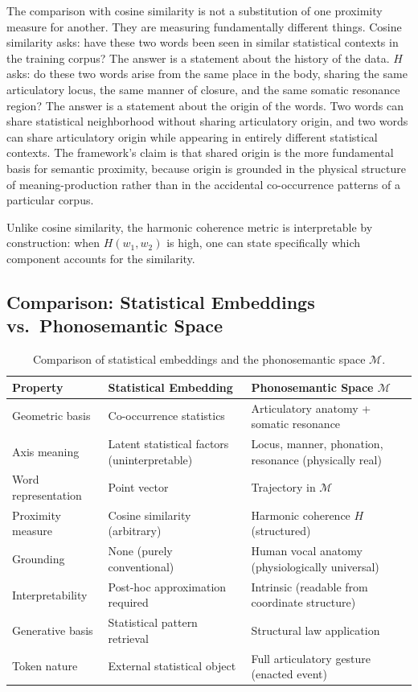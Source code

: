 \documentclass[12pt]{article}
\begin{document}
The comparison with cosine similarity is not a substitution of one proximity measure for another. They are measuring fundamentally different things. Cosine similarity asks: have these two words been seen in similar statistical contexts in the training corpus? The answer is a statement about the history of the data. $H$ asks: do these two words arise from the same place in the body, sharing the same articulatory locus, the same manner of closure, and the same somatic resonance region? The answer is a statement about the origin of the words. Two words can share statistical neighborhood without sharing articulatory origin, and two words can share articulatory origin while appearing in entirely different statistical contexts. The framework's claim is that shared origin is the more fundamental basis for semantic proximity, because origin is grounded in the physical structure of meaning-production rather than in the accidental co-occurrence patterns of a particular corpus.

Unlike cosine similarity, the harmonic coherence metric is interpretable by construction: when $H(w_1, w_2)$ is high, one can state specifically which component accounts for the similarity.

\subsection{Comparison: Statistical Embeddings vs.\ Phonosemantic Space}

\begin{table}[htbp]
\centering
\renewcommand{\arraystretch}{1.3}
\begin{tabular}{p{3cm}p{4.5cm}p{5cm}}
\toprule
\textbf{Property} & \textbf{Statistical Embedding} & \textbf{Phonosemantic Space $\mathcal{M}$} \\
\midrule
Geometric basis & Co-occurrence statistics & Articulatory anatomy + somatic resonance \\
Axis meaning & Latent statistical factors (uninterpretable) & Locus, manner, phonation, resonance (physically real) \\
Word representation & Point vector & Trajectory in $\mathcal{M}$ \\
Proximity measure & Cosine similarity (arbitrary) & Harmonic coherence $H$ (structured) \\
Grounding & None (purely conventional) & Human vocal anatomy (physiologically universal) \\
Interpretability & Post-hoc approximation required & Intrinsic (readable from coordinate structure) \\
Generative basis & Statistical pattern retrieval & Structural law application \\
Token nature & External statistical object & Full articulatory gesture (enacted event) \\
\bottomrule
\end{tabular}
\caption{Comparison of statistical embeddings and the phonosemantic space $\mathcal{M}$.}
\end{table}
\end{document}
